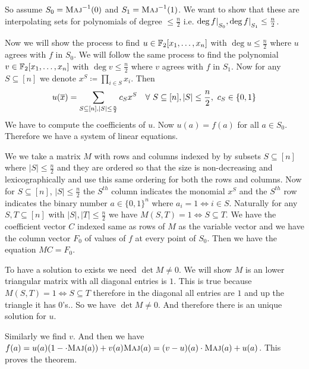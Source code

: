 \begin{proof-of-theorem}
	So assume $S_0=\textsc{Maj}^{-1}(0)$ and $S_1=\textsc{Maj}^{-1}(1)$. We want to show that these are interpolating sets for polynomials of degree $\leq \frac{n}{2}$ i.e. $\deg f|\strut_{S_0},\deg f|\strut_{S_1}\leq \frac{n}{2}$. 
	
	Now we will show the process to find $u\in\mathbb{F}_2[x_1,\dots, x_n]$ with $\deg u\leq \frac{n}{2}$ where $u$ agrees with $f$ in $S_0$. We will follow the same process to find the polynomial $v\in\mathbb{F}_2[x_1,\dots, x_n]$ with $\deg v\leq \frac{n}{2}$ where $v$ agrees with $f$ in $S_1$. Now for any $S\subseteq [n]$ we denote $x^S\coloneqq \prod\limits_{i\in S}x_i$. Then $$u(\ovx)=\sum_{S\subseteq[n], |S|\leq \frac{n}{2}}c_Sx^S\quad \forall \ S\subseteq[n],|S|\leq\frac{n}{2},\  c_S\in\{0,1\}$$We have to compute the coefficients of $u$. Now $u(a)=f(a)$ for all $a\in S_0$. Therefore we have a system of linear equations. 
	
	We we take a matrix $M$ with rows and columns indexed by by subsets $S\subseteq [n]$ where $|S|\leq\frac{n}{2}$ and they are ordered so that the size is non-decreasing and lexicographically and use this same ordering for both the rows and columns. Now for $S\subseteq [n]$, $|S|\leq \frac{n}{2}$ the $S^{th}$ column indicates the monomial $x^S$ and the $S^{th}$ row indicates the binary number $a\in\{0,1\}^n$ where $a_i=1\iff i\in S$. Naturally for any $S,T\subseteq [n]$ with $|S|,|T|\leq\frac{n}2$ we have $M(S,T) =1\iff S\subseteq T$. We have the coefficient vector $C$ indexed same as rows of $M$ as the variable vector and we have the column vector $F_0$ of values of $f$ at every point of $S_0$. Then we have the equation $MC=F_0$. 
	
	To have a solution to exists we need $\det M\neq0$. We will show $M$ is an lower triangular matrix with all diagonal entries is $1$. This is true because $M(S,T)=1\iff S\subseteq T$ therefore in the diagonal all entries are $1$ and up the triangle it has $0$'s.. So we have $\det M\neq 0$. And therefore there is an unique solution for $u$. 
	
	Similarly we find $v$. And then we have $f(a)=u(a)(1-\cdot\textsc{Maj}(a))+v(a)\textsc{Maj}(a)=(v-u)(a)\cdot \textsc{Maj}(a)+u(a)$.  This proves the theorem.
\end{proof-of-theorem}